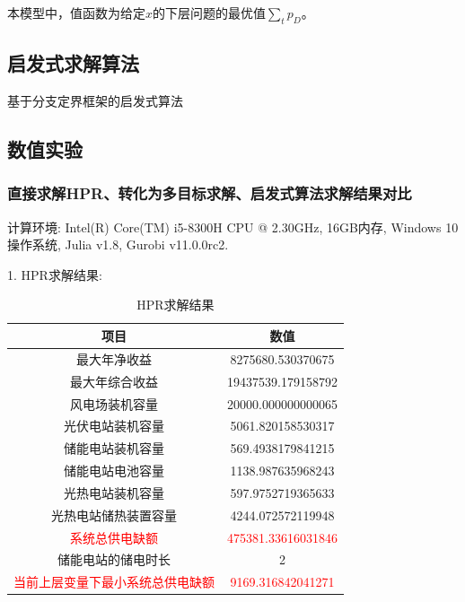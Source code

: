 \documentclass{article}
\begin{document}
本模型中，值函数为给定$x$的下层问题的最优值$\sum\limits_{t} p_D$。

\subsection{启发式求解算法}

\begin{algorithm}[H]
    \caption{基于分支定界框架的启发式算法}%
    \LinesNumbered %
\end{algorithm}

\clearpage
\subsection{数值实验}
\subsubsection{直接求解HPR、转化为多目标求解、启发式算法求解结果对比}
计算环境: Intel(R) Core(TM) i5-8300H CPU @ 2.30GHz, 16GB内存, Windows 10操作系统, Julia v1.8, Gurobi v11.0.0rc2.

 1. HPR求解结果:
\begin{table}[H]
    \centering
    \caption{HPR求解结果}
    \label{tab:energy_system_data}
    \begin{tabular}{c|c}
        \toprule
        \textbf{项目} & \textbf{数值} \\
        \midrule
        最大年净收益 & 8275680.530370675 \\
        最大年综合收益 & 19437539.179158792 \\
        风电场装机容量 & 20000.000000000065 \\
        光伏电站装机容量 & 5061.820158530317 \\
        储能电站装机容量 & 569.4938179841215 \\
        储能电站电池容量 & 1138.987635968243 \\
        光热电站装机容量 & 597.9752719365633 \\
        光热电站储热装置容量 & 4244.072572119948 \\
        \textcolor{red}{系统总供电缺额} & \textcolor{red}{475381.33616031846} \\
        储能电站的储电时长 & 2 \\
        \textcolor{red}{当前上层变量下最小系统总供电缺额} & \textcolor{red}{9169.316842041271} \\
        \bottomrule
    \end{tabular}
\end{table}
\end{document}
